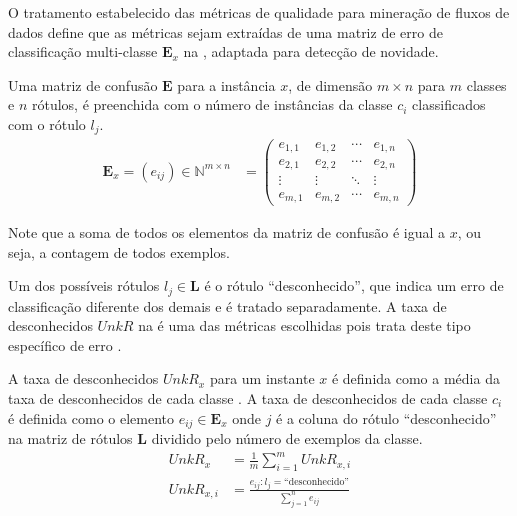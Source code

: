 O tratamento estabelecido das métricas de qualidade para mineração de fluxos de dados define
que as métricas sejam extraídas de uma matriz de erro de classificação
multi-classe $\mathbf{E}_x$ na , adaptada para detecção de
novidade.

\begin{definition}
  Uma matriz de confusão $\mathbf{E}$ para a instância $x$, de dimensão $m \times
  n$ para $m$ classes e $n$ rótulos, é preenchida com o número de instâncias da
  classe $c_i$ classificados com o rótulo $l_j$.
  \begin{align}
    \mathbf{E}_x = (e_{ij})\in \mathbb{N} ^{m\times n}
    &= \begin{pmatrix}
      e_{1,1} & e_{1,2} & \cdots & e_{1,n} \\
      e_{2,1} & e_{2,2} & \cdots & e_{2,n} \\
      \vdots  & \vdots  & \ddots & \vdots  \\
      e_{m,1} & e_{m,2} & \cdots & e_{m,n} 
    \end{pmatrix}  \label{eq:matrix}
  \end{align}
\end{definition}

Note que a soma de todos os elementos da matriz de confusão é igual a $x$, ou
seja, a contagem de todos exemplos.

Um dos possíveis rótulos $l_j \in \mathbf{L}$ é o rótulo ``desconhecido'', que
indica um erro de classificação diferente dos demais e é tratado separadamente.
A taxa de desconhecidos $\mathit{UnkR}$ na  é uma das métricas escolhidas
pois trata deste tipo específico de erro \cite{Faria2013evaluation}.

\begin{definition}
  A taxa de desconhecidos $\mathit{UnkR}_x$ para um instante $x$ é definida como
  a média da taxa de desconhecidos de cada classe \cite{Faria2013evaluation}.
  A taxa de desconhecidos de cada classe $c_i$ é definida como o elemento
  $e_{ij} \in \mathbf{E}_x$ onde $j$ é a coluna do rótulo ``desconhecido''
  na matriz de rótulos $\mathbf{L}$ dividido pelo número de exemplos da classe.
  \begin{align}
    \mathit{UnkR}_x & = \frac{1}{m} \sum_{i=1}^{m} \mathit{UnkR}_{x, i} \\
    \mathit{UnkR}_{x, i}
      &= \frac{e_{i j} : l_j = \text{``desconhecido''}}{\sum_{j=1}^{n} e_{i j}}
      \label{eq:unkr}
  \end{align}
\end{definition}

